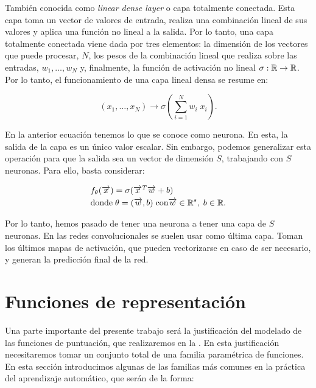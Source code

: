 También conocida como \textit{linear dense layer} o capa totalmente conectada. Esta capa toma un vector de valores de entrada, realiza una combinación lineal de sus valores y aplica una función no lineal a la salida. Por lo tanto, una capa totalmente conectada viene dada por tres elementos: la dimensión de los vectores que puede procesar, $N$, los pesos de la combinación lineal que realiza sobre las entradas, $w_1, \ldots, w_N$ y, finalmente, la función de activación no lineal $\sigma: \mathbb{R} \to \mathbb{R}$. Por lo tanto, el funcionamiento de una capa lineal densa se resume en:

\begin{equation}
    (x_1, \ldots, x_N) \to \sigma(\sum_{i = 1}^{N} w_i \; x_i).
\end{equation}

En la anterior ecuación tenemos lo que se conoce como neurona. En esta, la salida de la capa es un único valor escalar. Sin embargo, podemos generalizar esta operación para que la salida sea un vector de dimensión $S$, trabajando con $S$ neuronas. Para ello, basta considerar:

\begin{equation}
\begin{split}
    & f_\theta(\overrightarrow{x}) = \sigma(\overrightarrow{x}^T \overrightarrow{w} + b) \\
    & \text{donde} \; \theta = (\overrightarrow{w}, b) \; \text{con} \overrightarrow{w} \in \mathbb{R}^s, \; b \in \mathbb{R}.
\end{split}
\end{equation}

Por lo tanto, hemos pasado de tener una neurona a tener una capa de $S$ neuronas. En las redes convolucionales se suelen usar como última capa. Toman los últimos mapas de activación, que pueden vectorizarse en caso de ser necesario, y generan la predicción final de la red.

\section{Funciones de representación} \label{sec:funciones_representacion}

Una parte importante del presente trabajo será la justificación del modelado de las funciones de puntuación, que realizaremos en la . En esta justificación necesitaremos tomar un conjunto total de una familia paramétrica de funciones. En esta sección introducimos algunas de las familias más comunes en la práctica del aprendizaje automático, que serán de la forma:

